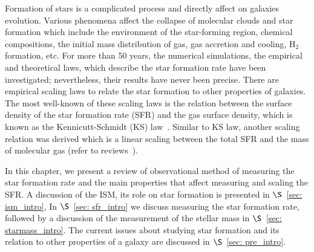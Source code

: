 Formation of stars is a complicated process and directly affect on galaxies evolution. 
Various phenomena affect the collapse of molecular clouds and star formation which include the environment of the star-forming region, chemical compositions, the initial mass distribution of gas, gas accretion and cooling, H$_2$ formation, etc. 
For more than 50 years, the numerical simulations, the empirical and theoretical laws, which describe the star formation rate have been investigated; nevertheless, their results have never been precise. 
There are empirical scaling laws to relate the star formation to other properties of galaxies. 
The most well-known of these scaling laws is the relation between the surface density of the star formation rate (SFR) and the gas surface density, which is known as the Kennicutt-Schmidt (KS) law~\citep{Schmidt59, Kennicutt98a}. 
Similar to KS law, another scaling relation was derived which is a linear scaling between the total SFR and the mass of molecular gas (refer to reviews~\cite{Elmgrenn11, Kennicutt12}). 

In this chapter, we present a review of observational method of measuring the star formation rate and the main properties that affect measuring and scaling the SFR. A discussion of the ISM, its role on star formation is presented in $\S$~\ref{sec: ism_intro}, In $\S$~\ref{sec: sfr_intro} we discuss measuring the star formation rate, followed by a discussion of the measurement of the stellar mass in $\S$~\ref{sec: starmass_intro}. The current issues about studying star formation and its relation to other properties of a galaxy are discussed in $\S$~\ref{sec: pre_intro}. 





